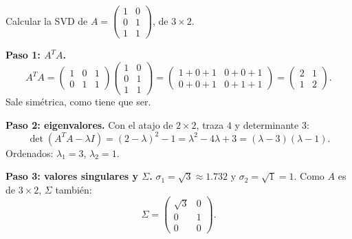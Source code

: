 \documentclass[11pt,letterpaper]{article}
\begin{document}
\begin{ejemplo}
    Calcular la SVD de
    $A = \begin{pmatrix} 1 & 0 \\ 0 & 1 \\ 1 & 1 \end{pmatrix}$, de
    $3 \times 2$.

    \textbf{Paso 1: $A^{T}A$.}
    \[
        A^{T}A = \begin{pmatrix} 1 & 0 & 1 \\ 0 & 1 & 1
        \end{pmatrix}
        \begin{pmatrix} 1 & 0 \\ 0 & 1 \\ 1 & 1 \end{pmatrix}
        = \begin{pmatrix} 1 + 0 + 1 & 0 + 0 + 1 \\ 0 + 0 + 1 &
                          0 + 1 + 1 \end{pmatrix}
        = \begin{pmatrix} 2 & 1 \\ 1 & 2 \end{pmatrix} .
    \]
    Sale simétrica, como tiene que ser.

    \textbf{Paso 2: eigenvalores.} Con el atajo de $2 \times 2$,
    traza $4$ y determinante $3$:
    \[
        \det(A^{T}A - \lambda I) = (2 - \lambda)^2 - 1
        = \lambda^2 - 4\lambda + 3 = (\lambda - 3)(\lambda - 1) .
    \]
    Ordenados: $\lambda_1 = 3$, $\lambda_2 = 1$.

    \textbf{Paso 3: valores singulares y $\Sigma$.}
    $\sigma_1 = \sqrt{3} \approx 1.732$ y $\sigma_2 = \sqrt{1} = 1$.
    Como $A$ es de $3 \times 2$, $\Sigma$ también:
    \[
        \Sigma = \begin{pmatrix} \sqrt{3} & 0 \\ 0 & 1 \\ 0 & 0
        \end{pmatrix} .
    \]


\end{ejemplo}
\end{document}
